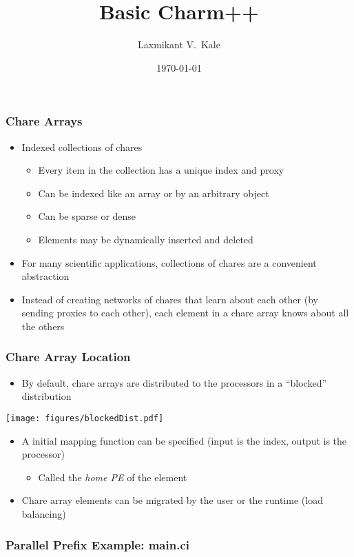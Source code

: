 \documentclass{beamer}
\title{Basic Charm++}
\author[Laxmikant V.~Kale]{
Laxmikant V.~Kale
}
\date{\today}
\begin{document}
\begin{frame}[fragile]
  \frametitle{Chare Arrays}
  \begin{itemize}
    \item Indexed collections of chares
      \begin{itemize}
      \item Every item in the collection has a unique index and proxy
      \item Can be indexed like an array or by an arbitrary object
      \item Can be sparse or dense
      \item Elements may be dynamically inserted and deleted
      \end{itemize}
    \item For many scientific applications, collections of chares are a
      convenient abstraction
    \item Instead of creating networks of chares that learn about each other
      (by sending proxies to each other), each element in a chare array knows
      about all the others
  \end{itemize}
\end{frame}

\begin{frame}
  \frametitle{Chare Array Location}
  \begin{itemize}
  \item By default, chare arrays are distributed to the processors in a
    ``blocked'' distribution
  \end{itemize}
  \begin{center} \texttt{[image: figures/blockedDist.pdf]} \end{center}
  \begin{itemize}
  \item A initial mapping function can be specified (input is the index, output
    is the processor)
    \begin{itemize}
    \item Called the \emph{home PE} of the element
    \end{itemize}
  \item Chare array elements can be migrated by the user or the runtime (load balancing)
  \end{itemize}
\end{frame}





\begin{frame}[fragile]
  \frametitle{Parallel Prefix Example: main.ci}
  
\end{frame}
\end{document}
